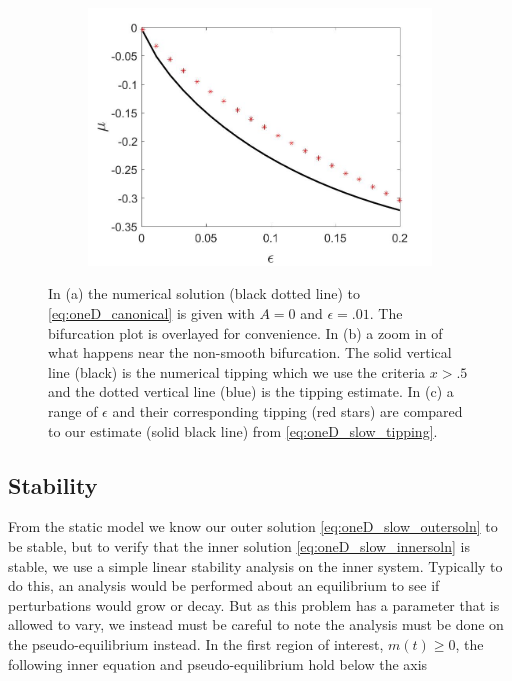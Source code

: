 \begin{figure}[H]
\begin{subfigure}{.5\textwidth}
\includegraphics[width=\linewidth]{oneD/slow_epscomp.jpg}
\caption{}
\label{fig:oneD_slow_comp}
\end{subfigure}
\caption{In (a) the numerical solution (black dotted line) to \eqref{eq:oneD_canonical} is given with $A=0$ and $\epsilon=.01$. The bifurcation plot is overlayed for convenience. In (b) a zoom in of what happens near the non-smooth bifurcation. The solid vertical line (black) is the numerical tipping which we use the criteria $x>.5$ and the dotted vertical line (blue) is the tipping estimate. In (c) a range of $\epsilon$ and their corresponding tipping (red stars) are compared to our estimate (solid black line) from \eqref{eq:oneD_slow_tipping}.}
\label{fig:oneD_slow_numerics}
\end{figure}


\subsection{Stability}
From the static model we know our outer solution \eqref{eq:oneD_slow_outersoln} to be stable, but to verify that the inner solution \eqref{eq:oneD_slow_innersoln} is stable, we use a simple linear stability analysis on the inner system. Typically to do this, an analysis would be performed about an equilibrium to see if perturbations would grow or decay. But as this problem has a parameter that is allowed to vary, we instead must be careful to note the analysis must be done on the pseudo-equilibrium instead. In the first region of interest, $m(t)\ge 0$, the following inner equation and pseudo-equilibrium hold below the axis

